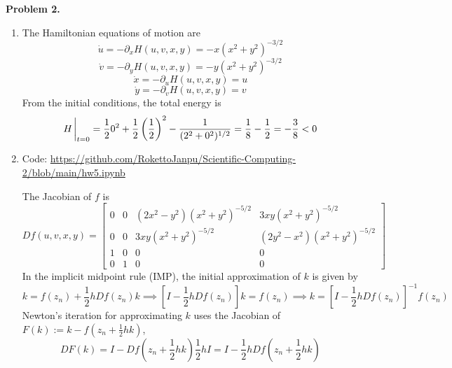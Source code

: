 \documentclass{article}
\def\tbf#1{\textbf{#1}}
\newcommand{\br}[1]{\left(#1\right)}
\newcommand{\sbr}[1]{\left[#1\right]}
\newcommand{\m}[2][b]{\begin{#1matrix}#2\end{#1matrix}}
\newcommand{\inv}{^{-1}}
\newcommand{\imp}{\implies}
\newcommand{\ptl}{\partial}
\begin{document}
\tbf{Problem 2.}

\begin{enumerate}[label=(\alph*)]
	
\item The Hamiltonian equations of motion are
$$\dot u = -\ptl_xH(u,v,x,y) = -x(x^2+y^2)^{-3/2}$$
$$\dot v = -\ptl_yH(u,v,x,y) = -y(x^2+y^2)^{-3/2}$$
$$\dot x = -\ptl_uH(u,v,x,y) = u$$
$$\dot y = -\ptl_vH(u,v,x,y) = v$$
From the initial conditions, the total energy is
$$H\eval_{t=0} = \frac120^2 + \frac12\br{\frac12}^2 - \frac{1}{(2^2+0^2)^{1/2}} = \frac18 - \frac12 = -\frac38 < 0$$


\item Code: \url{https://github.com/RokettoJanpu/Scientific-Computing-2/blob/main/hw5.ipynb}

The Jacobian of $f$ is
$$Df(u,v,x,y) = \m{
0 & 0 & (2x^2 - y^2)(x^2 + y^2)^{-5/2} & 3xy(x^2 + y^2)^{-5/2} \\
0 & 0 & 3xy(x^2 + y^2)^{-5/2} & (2y^2 - x^2)(x^2 + y^2)^{-5/2} \\
1 & 0 & 0 & 0\\
0 & 1 & 0 & 0
}$$
In the implicit midpoint rule (IMP), the initial approximation of $k$ is given by
$$k = f(z_n) + \frac12hDf(z_n)k
\imp \sbr{I - \frac12hDf(z_n)}k = f(z_n)
\imp k = \sbr{I - \frac12hDf(z_n)}\inv f(z_n)$$
Newton's iteration for approximating $k$ uses the Jacobian of $F(k):=k-f(z_n+\frac12hk)$,
$$DF(k) = I - Df\br{z_n + \frac12hk}\frac12hI = I - \frac12hDf\br{z_n + \frac12hk}$$


\end{enumerate}
\end{document}
